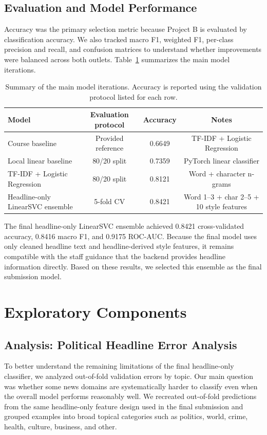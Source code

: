 \documentclass[10pt]{article}
\begin{document}
\subsection{Evaluation and Model Performance}
Accuracy was the primary selection metric because Project B is evaluated by classification accuracy. We also tracked macro F1, weighted F1, per-class precision and recall, and confusion matrices to understand whether improvements were balanced across both outlets. Table~\ref{tab:model-results} summarizes the main model iterations.

\begin{table}[h]
\centering
\small
\begin{tabular*}{\textwidth}{@{\extracolsep{\fill}}lccc}
\hline
Model & Evaluation protocol & Accuracy & Notes \\
\hline
Course baseline & Provided reference & 0.6649 & TF-IDF + Logistic Regression \\
Local linear baseline & 80/20 split & 0.7359 & PyTorch linear classifier \\
TF-IDF + Logistic Regression & 80/20 split & 0.8121 & Word + character n-grams \\
Headline-only LinearSVC ensemble & 5-fold CV & 0.8421 & Word 1--3 + char 2--5 + 10 style features \\
\hline
\end{tabular*}
\caption{Summary of the main model iterations. Accuracy is reported using the validation protocol listed for each row.}
\label{tab:model-results}
\end{table}

The final headline-only LinearSVC ensemble achieved 0.8421 cross-validated accuracy, 0.8416 macro F1, and 0.9175 ROC-AUC. Because the final model uses only cleaned headline text and headline-derived style features, it remains compatible with the staff guidance that the backend provides headline information directly. Based on these results, we selected this ensemble as the final submission model.

\section{Exploratory Components}

\subsection{Analysis: Political Headline Error Analysis}
To better understand the remaining limitations of the final headline-only classifier, we analyzed out-of-fold validation errors by topic. Our main question was whether some news domains are systematically harder to classify even when the overall model performs reasonably well. We recreated out-of-fold predictions from the same headline-only feature design used in the final submission and grouped examples into broad topical categories such as politics, world, crime, health, culture, business, and other.
\end{document}
